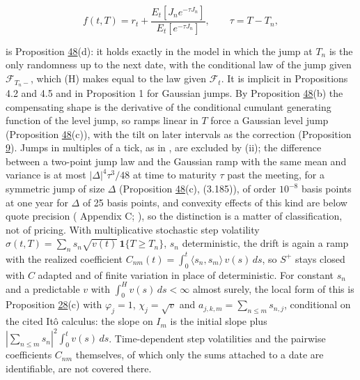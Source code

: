 \documentclass[11pt]{article}
\begin{document}
\begin{equation*}
f(t, T) = r_t + \frac{E_t[J_n e^{-\tau J_n}]}{E_t[e^{-\tau J_n}]}, \qquad \tau = T - T_n, \tag{5.1}\label{eq:5.1}
\end{equation*}

is Proposition \hyperref[res:Proposition-48]{48}(d): it holds exactly in the model in which the jump at \(T_n\) is the only randomness up to the next date, with the conditional law of the jump given \(\mathcal F_{T_n-}\), which (H) makes equal to the law given \(\mathcal F_t\). It is implicit in \cite{fontana2022term} Propositions 4.2 and 4.5 and in \cite{kim2014jumps} Proposition 1 for Gaussian jumps. By Proposition \hyperref[res:Proposition-48]{48}(b) the compensating shape is the derivative of the conditional cumulant generating function of the level jump, so ramps linear in \(T\) force a Gaussian level jump (Proposition \hyperref[res:Proposition-48]{48}(c)), with the tilt on later intervals as the correction (Proposition \hyperref[res:Proposition-9]{9}). Jumps in multiples of a tick, as in \cite{silva2024discretely}, are excluded by (ii); the difference between a two-point jump law and the Gaussian ramp with the same mean and variance is at most \(|\Delta|^4\tau^3/48\) at time to maturity \(\tau\) past the meeting, for a symmetric jump of size \(\Delta\) (Proposition \hyperref[res:Proposition-48]{48}(c), (3.185)), of order \(10^{-8}\) basis points at one year for \(\Delta\) of 25 basis points, and convexity effects of this kind are below quote precision (\cite{brace2024sofr} Appendix C; \cite{skov2021dynamic}), so the distinction is a matter of classification, not of pricing. With multiplicative stochastic step volatility \(\sigma(t, T) = \sum_n s_n \sqrt{v(t)}\, \mathbf 1\{T \ge T_n\}\), \(s_n\) deterministic, the drift is again a ramp with the realized coefficient \(C_{nm}(t) = \int_0^t \langle s_n, s_m \rangle\, v(s)\,ds\), so \(S^+\) stays closed with \(C\) adapted and of finite variation in place of deterministic. For constant \(s_n\) and a predictable \(v\) with \(\int_0^H v(s)\,ds<\infty\) almost surely, the local form of this is Proposition \hyperref[res:Proposition-28]{28}(c) with \(\varphi_j=1\), \(\chi_j=\sqrt v\) and \(a_{j,k,m}=\sum_{n\le m}s_{n,j}\), conditional on the cited Itô calculus: the slope on \(I_m\) is the initial slope plus \(|\sum_{n\le m}s_n|^2\int_0^t v(s)\,ds\). Time-dependent step volatilities and the pairwise coefficients \(C_{nm}\) themselves, of which only the sums attached to a date are identifiable, are not covered there.
\end{document}
